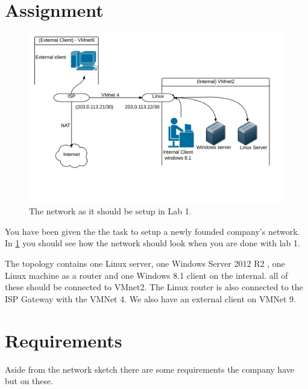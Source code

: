 \documentclass[paper=a4, fontsize=11pt]{report} %
\begin{document}
\section{Assignment}
\begin{figure}[h]
\centering
\includegraphics[width=1\linewidth]{./network}
\caption[Figure over network in Lab 1]{The network as it should be setup in Lab 1.}
\label{fig:network}
\end{figure}
You have been given the the task to setup a newly founded company's network. In \figurename \ref{fig:network} you should see how the network should look when you are done with lab 1.

The topology contains one Linux server, one Windows Server 2012 R2 , one Linux machine as a router and one Windows 8.1 client on the internal. all of these should be connected to VMnet2. The Linux router is also connected to the ISP Gateway with the VMNet 4.
We also have an external client on VMNet 9.

\section{Requirements}
\label{tasks}
Aside from the network sketch there are some requirements the company have but on these.
\end{document}
